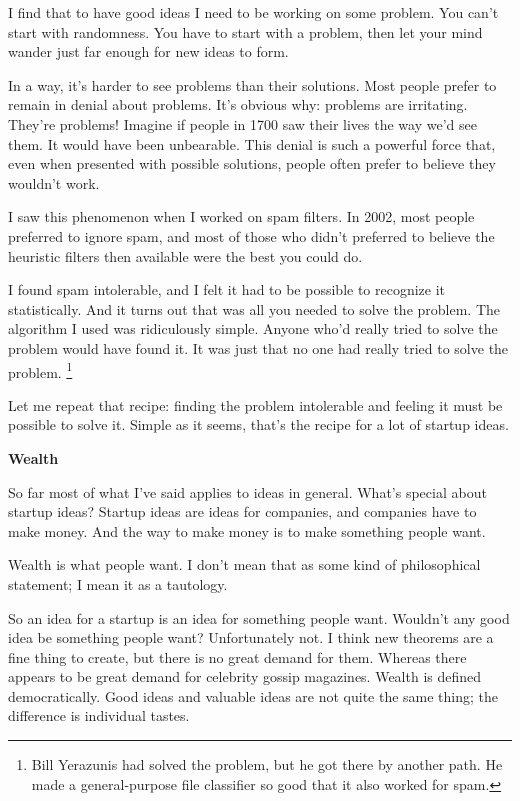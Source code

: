 I find that to have good ideas I need to be working on some problem. You
can't start with randomness. You have to start with a problem, then let
your mind wander just far enough for new ideas to form.

In a way, it's harder to see problems than their solutions. Most people
prefer to remain in denial about problems. It's obvious why: problems
are irritating. They're problems! Imagine if people in 1700 saw their
lives the way we'd see them. It would have been unbearable. This denial
is such a powerful force that, even when presented with possible
solutions, people often prefer to believe they wouldn't work.

I saw this phenomenon when I worked on spam filters. In 2002, most
people preferred to ignore spam, and most of those who didn't preferred
to believe the heuristic filters then available were the best you could
do.

I found spam intolerable, and I felt it had to be possible to recognize
it statistically. And it turns out that was all you needed to solve the
problem. The algorithm I used was ridiculously simple. Anyone who'd
really tried to solve the problem would have found it. It was just that
no one had really tried to solve the problem. \footnote{Bill Yerazunis had solved the problem, but he got there by
another path. He made a general-purpose file classifier so good that it
also worked for spam.}

Let me repeat that recipe: finding the problem intolerable and feeling
it must be possible to solve it. Simple as it seems, that's the recipe
for a lot of startup ideas.

\textbf{Wealth}

So far most of what I've said applies to ideas in general. What's
special about startup ideas? Startup ideas are ideas for companies, and
companies have to make money. And the way to make money is to make
something people want.

Wealth is what people want. I don't mean that as some kind of
philosophical statement; I mean it as a tautology.

So an idea for a startup is an idea for something people want. Wouldn't
any good idea be something people want? Unfortunately not. I think new
theorems are a fine thing to create, but there is no great demand for
them. Whereas there appears to be great demand for celebrity gossip
magazines. Wealth is defined democratically. Good ideas and valuable
ideas are not quite the same thing; the difference is individual tastes.

